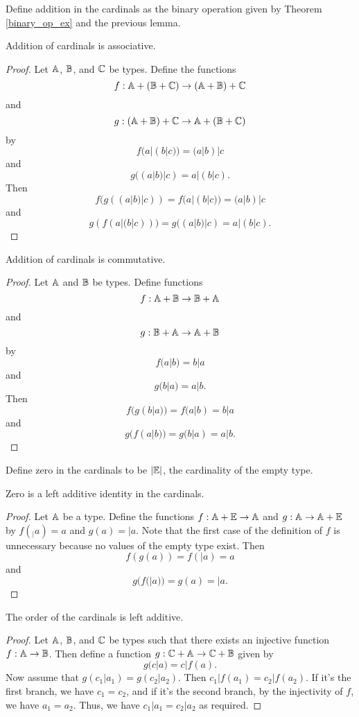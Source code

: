 \documentclass[../../math.tex]{subfiles}
\begin{document}
\begin{instance}
    Define addition in the cardinals as the binary operation given by Theorem
    \ref{binary_op_ex} and the previous lemma.
\end{instance}

\begin{instance}
    Addition of cardinals is associative.
\end{instance}
\begin{proof}
    Let $\mathbb{A}$, $\mathbb{B}$, and $\mathbb{C}$ be types.  Define the functions
    \[
        f : \mathbb{A} + (\mathbb{B} + \mathbb{C}) \to (\mathbb{A} + \mathbb{B}) + \mathbb{C}
    \]
    and
    \[
        g : (\mathbb{A} + \mathbb{B}) + \mathbb{C} \to \mathbb{A} + (\mathbb{B} + \mathbb{C})
    \]
    by
    \[
        f(a|(b|c)) = (a|b)|c
    \]
    and
    \[
        g((a|b)|c) = a|(b|c).
    \]
    Then
    \[
        f(g((a|b)|c)) = f(a|(b|c)) = (a|b)|c
    \]
    and
    \[
        g(f(a|(b|c))) = g((a|b)|c) = a|(b|c).
    \]
\end{proof}

\begin{instance}
    Addition of cardinals is commutative.
\end{instance}
\begin{proof}
    Let $\mathbb{A}$ and $\mathbb{B}$ be types.  Define functions
    \[
        f : \mathbb{A} + \mathbb{B} \to \mathbb{B} + \mathbb{A}
    \]
    and
    \[
        g : \mathbb{B} + \mathbb{A} \to \mathbb{A} + \mathbb{B}
    \]
    by
    \[
        f(a|b) = b|a
    \]
    and
    \[
        g(b|a) = a|b.
    \]
    Then
    \[
        f(g(b|a)) = f(a|b) = b|a
    \]
    and
    \[
        g(f(a|b)) = g(b|a) = a|b.
    \]
\end{proof}

\begin{instance}
    Define zero in the cardinals to be $|\mathbb{E}|$, the cardinality of the empty
    type.
\end{instance}

\begin{instance}
    Zero is a left additive identity in the cardinals.
\end{instance}
\begin{proof}
    Let $\mathbb{A}$ be a type.  Define the functions $f : \mathbb{A} + \mathbb{E} \to \mathbb{A}$ and $g : \mathbb{A}
    \to \mathbb{A} + \mathbb{E}$ by $f(_|a) = a$ and $g(a) = |a$.  Note that the first case of
    the definition of $f$ is unnecessary because no values of the empty type
    exist.  Then
    \[
        f(g(a)) = f(|a) = a
    \]
    and
    \[
        g(f(|a)) = g(a) = |a.
    \]
\end{proof}

\begin{instance}
    The order of the cardinals is left additive.
\end{instance}
\begin{proof}
    Let $\mathbb{A}$, $\mathbb{B}$, and $\mathbb{C}$ be types such that there exists an injective
    function $f : \mathbb{A} \to \mathbb{B}$.  Then define a function $g : \mathbb{C} + \mathbb{A} \to \mathbb{C} + \mathbb{B}$
    given by
    \[
        g(c|a) = c|f(a).
    \]
    Now assume that $g(c_1|a_1) = g(c_2|a_2)$.  Then $c_1|f(a_1) = c_2|f(a_2)$.
    If it's the first branch, we have $c_1 = c_2$, and if it's the second
    branch, by the injectivity of $f$, we have $a_1 = a_2$.  Thus, we have
    $c_1|a_1 = c_2|a_2$ as required.
\end{proof}
\end{document}

